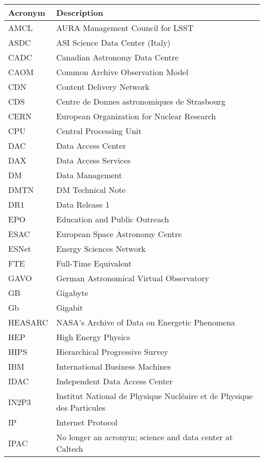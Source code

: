 \addtocounter{table}{-1}
\begin{longtable}{p{}p{}}\hline
\textbf{Acronym} & \textbf{Description}  \\\hline

AMCL & AURA Management Council for LSST \\\hline
ASDC & ASI Science Data Center (Italy) \\\hline
CADC & Canadian Astronomy Data Centre \\\hline
CAOM & Common Archive Observation Model \\\hline
CDN & Content Delivery Network \\\hline
CDS & Centre de Donnes astronomiques de Strasbourg \\\hline
CERN & European Organization for Nuclear Research \\\hline
CPU & Central Processing Unit \\\hline
DAC & Data Access Center \\\hline
DAX & Data Access Services \\\hline
DM & Data Management \\\hline
DMTN & DM Technical Note \\\hline
DR1 & Data Release 1 \\\hline
EPO & Education and Public Outreach \\\hline
ESAC & European Space Astronomy Centre \\\hline
ESNet & Energy Sciences Network \\\hline
FTE & Full-Time Equivalent \\\hline
GAVO & German Astronomical Virtual Observatory \\\hline
GB & Gigabyte \\\hline
Gb & Gigabit \\\hline
HEASARC & NASA's Archive of Data on Energetic Phenomena \\\hline
HEP &  High Energy Physics \\\hline
HIPS & Hierarchical Progressive Survey \\\hline
IBM & International Business Machines \\\hline
IDAC & Independent Data Access Center \\\hline
IN2P3 & Institut National de Physique Nucléaire et de Physique des Particules \\\hline
IP & Internet Protocol \\\hline
IPAC & No longer an acronym; science and data center at Caltech \\\hline

\end{longtable}
